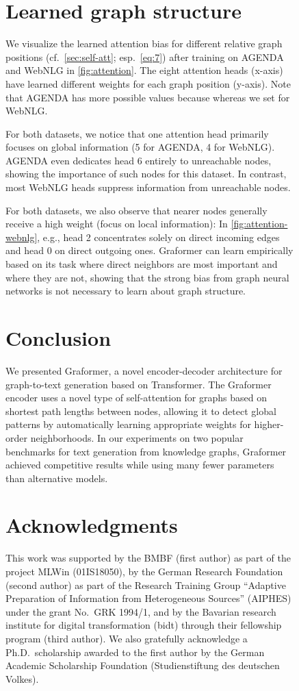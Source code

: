 \documentclass[11pt]{article}
\begin{document}
\begin{figure}
\begin{tabular}
\section{Learned graph structure}
\label{sec:learned_structure}

We visualize the learned attention bias 
for different relative graph positions  (cf.\ \cref{sec:self-att}; esp.\ \cref{eq:7})
after training on AGENDA and WebNLG
in \cref{fig:attention}.
The eight attention heads (x-axis)
have learned
different weights for each graph position  (y-axis).
Note that AGENDA has more possible  values
because  whereas we set  for WebNLG.

For both datasets,
we notice that one attention head primarily focuses on global information
(5 for AGENDA, 4 for WebNLG).
AGENDA even dedicates head 6 entirely to unreachable nodes, showing the importance of such nodes for this dataset.
In contrast, most WebNLG heads
suppress information from unreachable nodes.

For both datasets,
we also observe that nearer nodes generally receive a high weight (focus on local information):
In \cref{fig:attention-webnlg}, e.g., head 2 concentrates solely on direct incoming edges and head 0 on direct outgoing ones.
Graformer can learn empirically based on its task
where direct neighbors are most important and where they are not, 
showing that the strong bias from graph neural networks is
not
necessary to learn about graph structure.


\section{Conclusion}
We presented
Graformer,
a novel encoder-decoder architecture for graph-to-text generation based on Transformer.
The Graformer encoder uses a novel type of self-attention
for graphs based on shortest path lengths between nodes,
allowing it to detect global patterns
by automatically learning appropriate weights for higher-order neighborhoods.
In our experiments on two popular benchmarks for text generation from knowledge graphs,
Graformer achieved competitive results
while using many fewer parameters than alternative models.

\section*{Acknowledgments}

This work was supported by the
BMBF (first author) as part of the project MLWin (01IS18050),
by the German Research Foundation (second author) as part of the Research Training Group ``Adaptive Preparation of Information from Heterogeneous Sources'' (AIPHES) under the grant No.\ GRK 1994/1,
and by the Bavarian research institute for digital transformation (bidt) through their fellowship program (third author).
We also gratefully acknowledge a Ph.D.\ scholarship
awarded to the first author by the German Academic Scholarship Foundation (Studienstiftung des
deutschen Volkes).


\end{tabular}
\end{figure}
\end{document}
